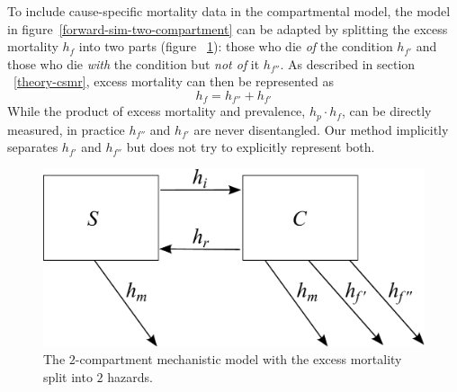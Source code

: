 
To include cause-specific mortality data in the compartmental model,
the model in figure~\ref{forward-sim-two-compartment} can be adapted
by splitting the excess mortality $h_{f}$ into two parts (figure
~\ref{fig:two_compartment_2f}): those who die \emph{of} the
condition $h_{f'}$ and those who die \emph{with} the condition but
\emph{not of} it $h_{f''}$.  As described in section
~\ref{theory-csmr}, excess mortality can then be represented as
    \begin{equation*}
        h_{f} = h_{f''} + h_{f'}
    \end{equation*}
While the product of excess mortality and prevalence, $h_{p} \cdot h_{f}$,
can be directly measured, in practice $h_{f''}$ and $h_{f'}$ are never
disentangled.  Our method implicitly separates $h_{f'}$ and $h_{f''}$
but does not try to explicitly represent both.

    \begin{figure}[h]
        \begin{center}
            \includegraphics[width=\textwidth]{SC2.pdf}
            \caption{The $2$-compartment mechanistic model with the
              excess mortality split into $2$ hazards.}
            \label{fig:two_compartment_2f}
        \end{center}
    \end{figure}

